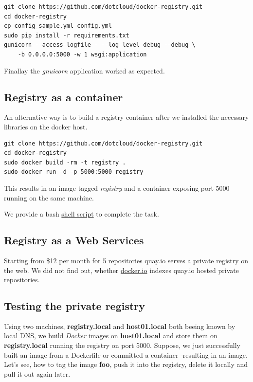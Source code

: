 \documentclass[captions=tableheading]{article}
\begin{document}
\begin{verbatim}
git clone https://github.com/dotcloud/docker-registry.git
cd docker-registry
cp config_sample.yml config.yml
sudo pip install -r requirements.txt
gunicorn --access-logfile - --log-level debug --debug \
    -b 0.0.0.0:5000 -w 1 wsgi:application
\end{verbatim}
Finallay the \emph{gnuicorn} application worked as expected.
\subsection{Registry as a container}
\label{sec-3-5}

An alternative way is to build a registry container after we installed the necessary libraries on the docker host.

\begin{verbatim}
git clone https://github.com/dotcloud/docker-registry.git
cd docker-registry
sudo docker build -rm -t registry .
sudo docker run -d -p 5000:5000 registry
\end{verbatim}
This results in an image tagged \emph{registry} and a container exposing port 5000 running on the same machine.

We provide a bash \href{file:///debiandata/michael/elemica/docker/poc-docker-jenkins/container_builds/registry/buildRegistry.sh}{shell script}  to complete the task.
\subsection{Registry as a Web Services}
\label{sec-3-6}

Starting from \$12 per month for 5 repositories \href{https://quay.io/}{quay.io} serves a private registry on the web. We did not find out, whether \href{https://index.docker.io/}{docker.io} indexes quay.io hosted private repositories.
\subsection{Testing the private registry}
\label{sec-3-7}

Using two machines, \textbf{registry.local} and \textbf{host01.local} both beeing known by local DNS, we build \emph{Docker} images on \textbf{host01.local} and store them on \textbf{registry.local} running the registry on port 5000.  Suppose, we just successfully built an image from a Dockerfile or committed a container -resulting in an image. Let's see, how to tag the image \textbf{foo}, push it into the registry, delete it locally and pull it out again later. 
\end{document}
